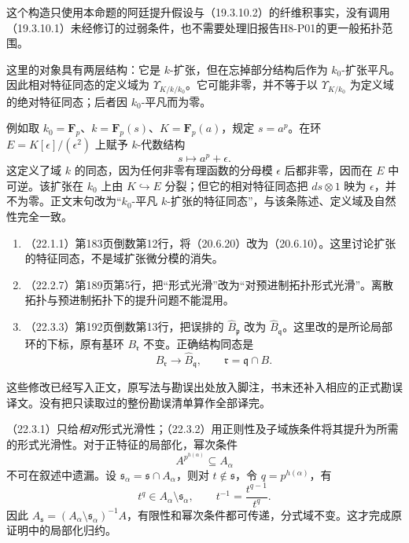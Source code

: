 这个构造只使用本命题的阿廷提升假设与（19.3.10.2）的纤维积事实，没有调用（19.3.10.1）未经修订的过弱条件，也不需要处理旧报告H8-P01的更一般拓扑范围。

这里的对象具有两层结构：它是 $k$-扩张，但在忘掉部分结构后作为 $k_0$-扩张平凡。因此相对特征同态的定义域为 $\Upsilon_{K/k/k_0}$。它可能非零，并不等于以 $\Upsilon_{K/k_0}$ 为定义域的绝对特征同态；后者因 $k_0$-平凡而为零。

例如取 $k_0=\mathbf F_p$、$k=\mathbf F_p(s)$、$K=\mathbf F_p(a)$，规定 $s=a^p$。在环 $E=K[\epsilon]/(\epsilon^2)$ 上赋予 $k$-代数结构
\[
 s\longmapsto a^p+\epsilon.
\]
这定义了域 $k$ 的同态，因为任何非零有理函数的分母模 $\epsilon$ 后都非零，因而在 $E$ 中可逆。该扩张在 $k_0$ 上由 $K\hookrightarrow E$ 分裂；但它的相对特征同态把 $ds\otimes1$ 映为 $\epsilon$，并不为零。正文末句改为“$k_0$-平凡 $k$-扩张的特征同态”，与该条陈述、定义域及自然性完全一致。

\begin{enumerate}[label=\arabic*.,leftmargin=2.5em]
\item （22.1.1）第183页倒数第12行，将（20.6.20）改为（20.6.10）。这里讨论扩张的特征同态，不是域扩张微分模的消失。
\item （22.2.7）第189页第5行，把“形式光滑”改为“对预进制拓扑形式光滑”。离散拓扑与预进制拓扑下的提升问题不能混用。
\item （22.3.3）第192页倒数第13行，把误排的 $\widehat B_{\mathfrak p}$ 改为 $\widehat B_{\mathfrak q}$。这里改的是所论局部环的下标，原有基环 $B_{\mathfrak r}$ 不变。正确结构同态是
\[
 B_{\mathfrak r}\longrightarrow\widehat B_{\mathfrak q},
 \qquad\mathfrak r=\mathfrak q\cap B.
\]
\end{enumerate}
这些修改已经写入正文，原写法与勘误出处放入脚注，书末还补入相应的正式勘误译文。没有把只读取过的整份勘误清单算作全部译完。

（22.3.1）只给\emph{相对}形式光滑性；（22.3.2）用正则性及子域族条件将其提升为所需的形式光滑性。对于正特征的局部化，幂次条件
\[
 A^{p^{h(\alpha)}}\subseteq A_\alpha
\]
不可在叙述中遗漏。设 $\mathfrak s_\alpha=\mathfrak s\cap A_\alpha$，则对 $t\notin\mathfrak s$，令 $q=p^{h(\alpha)}$，有
\[
 t^q\in A_\alpha\setminus\mathfrak s_\alpha,
 \qquad t^{-1}=\frac{t^{q-1}}{t^q}.
\]
因此 $A_{\mathfrak s}=(A_\alpha\setminus\mathfrak s_\alpha)^{-1}A$，有限性和幂次条件都可传递，分式域不变。这才完成原证明中的局部化归约。

